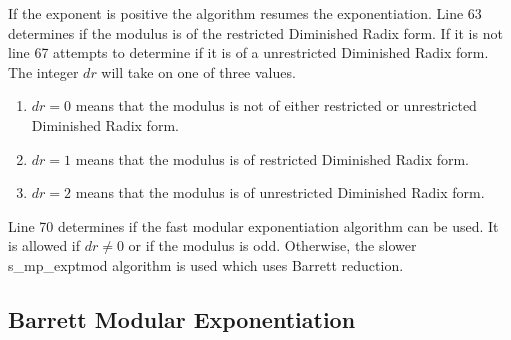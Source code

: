 \documentclass[b5paper]{book}
\begin{document}
If the exponent is positive the algorithm resumes the exponentiation.  Line 63 determines if the modulus is of the restricted Diminished Radix 
form.  If it is not line 67 attempts to determine if it is of a unrestricted Diminished Radix form.  The integer $dr$ will take on one
of three values.

\begin{enumerate}
\item $dr = 0$ means that the modulus is not of either restricted or unrestricted Diminished Radix form.
\item $dr = 1$ means that the modulus is of restricted Diminished Radix form.
\item $dr = 2$ means that the modulus is of unrestricted Diminished Radix form.
\end{enumerate}

Line 70 determines if the fast modular exponentiation algorithm can be used.  It is allowed if $dr \ne 0$ or if the modulus is odd.  Otherwise,
the slower s\_mp\_exptmod algorithm is used which uses Barrett reduction.  

\subsection{Barrett Modular Exponentiation}
\end{document}
